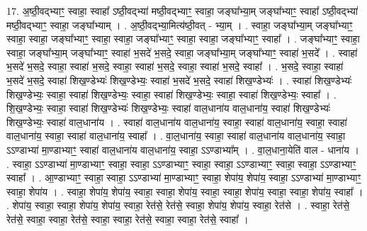 \documentclass[17pt]{extarticle}
\begin{document}
17. अ॒ष्ठी॒वद्भ्याꣳ॒॒ स्वाहा॒ स्वाहा᳚ ऽष्ठी॒वद्भ्या॑ मष्ठी॒वद्भ्याꣳ॒॒ स्वाहा॒ जङ्घा᳚भ्या॒म् जङ्घा᳚भ्याꣳ॒॒ स्वाहा᳚ ऽष्ठी॒वद्भ्या॑ मष्ठी॒वद्भ्याꣳ॒॒ स्वाहा॒ जङ्घा᳚भ्याम् । . अ॒ष्ठी॒वद्भ्या॒मित्य॑ष्ठी॒वत् - भ्या॒म् । . स्वाहा॒ जङ्घा᳚भ्या॒म् जङ्घा᳚भ्याꣳ॒॒ स्वाहा॒ स्वाहा॒ जङ्घा᳚भ्याꣳ॒॒ स्वाहा॒ स्वाहा॒ जङ्घा᳚भ्याꣳ॒॒ स्वाहा॒ स्वाहा॒ जङ्घा᳚भ्याꣳ॒॒ स्वाहा᳚ । . जङ्घा᳚भ्याꣳ॒॒ स्वाहा॒ स्वाहा॒ जङ्घा᳚भ्या॒म् जङ्घा᳚भ्याꣳ॒॒ स्वाहा॑ भ॒सदे॑ भ॒सदे॒ स्वाहा॒ जङ्घा᳚भ्या॒म् जङ्घा᳚भ्याꣳ॒॒ स्वाहा॑ भ॒सदे᳚ । . स्वाहा॑ भ॒सदे॑ भ॒सदे॒ स्वाहा॒ स्वाहा॑ भ॒सदे॒ स्वाहा॒ स्वाहा॑ भ॒सदे॒ स्वाहा॒ स्वाहा॑ भ॒सदे॒ स्वाहा᳚ । . भ॒सदे॒ स्वाहा॒ स्वाहा॑ भ॒सदे॑ भ॒सदे॒ स्वाहा॑ शिख॒ण्डेभ्यः॑ शिख॒ण्डेभ्यः॒ स्वाहा॑ भ॒सदे॑ भ॒सदे॒ स्वाहा॑ शिख॒ण्डेभ्यः॑ । . स्वाहा॑ शिख॒ण्डेभ्यः॑ शिख॒ण्डेभ्यः॒ स्वाहा॒ स्वाहा॑ शिख॒ण्डेभ्यः॒ स्वाहा॒ स्वाहा॑ शिख॒ण्डेभ्यः॒ स्वाहा॒ स्वाहा॑ शिख॒ण्डेभ्यः॒ स्वाहा᳚ । . शि॒ख॒ण्डेभ्यः॒ स्वाहा॒ स्वाहा॑ शिख॒ण्डेभ्यः॑ शिख॒ण्डेभ्यः॒ स्वाहा॑ वाल॒धाना॑य वाल॒धाना॑य॒ स्वाहा॑ शिख॒ण्डेभ्यः॑ शिख॒ण्डेभ्यः॒ स्वाहा॑ वाल॒धाना॑य । . स्वाहा॑ वाल॒धाना॑य वाल॒धाना॑य॒ स्वाहा॒ स्वाहा॑ वाल॒धाना॑य॒ स्वाहा॒ स्वाहा॑ वाल॒धाना॑य॒ स्वाहा॒ स्वाहा॑ वाल॒धाना॑य॒ स्वाहा᳚ । . वा॒ल॒धाना॑य॒ स्वाहा॒ स्वाहा॑ वाल॒धाना॑य वाल॒धाना॑य॒ स्वाहा॒ ऽऽण्डाभ्या॑ मा॒ण्डाभ्याꣳ॒॒ स्वाहा॑ वाल॒धाना॑य वाल॒धाना॑य॒ स्वाहा॒ ऽऽण्डाभ्या᳚म् । . वा॒ल॒धाना॒येति॑ वाल - धाना॑य । . स्वाहा॒ ऽऽण्डाभ्या॑ मा॒ण्डाभ्याꣳ॒॒ स्वाहा॒ स्वाहा॒ ऽऽण्डाभ्याꣳ॒॒ स्वाहा॒ स्वाहा॒ ऽऽण्डाभ्याꣳ॒॒ स्वाहा॒ स्वाहा॒ ऽऽण्डाभ्याꣳ॒॒ स्वाहा᳚ । . आ॒ण्डाभ्याꣳ॒॒ स्वाहा॒ स्वाहा॒ ऽऽण्डाभ्या॑ मा॒ण्डाभ्याꣳ॒॒ स्वाहा॒ शेपा॑य॒ शेपा॑य॒ स्वाहा॒ ऽऽण्डाभ्या॑ मा॒ण्डाभ्याꣳ॒॒ स्वाहा॒ शेपा॑य । . स्वाहा॒ शेपा॑य॒ शेपा॑य॒ स्वाहा॒ स्वाहा॒ शेपा॑य॒ स्वाहा॒ स्वाहा॒ शेपा॑य॒ स्वाहा॒ स्वाहा॒ शेपा॑य॒ स्वाहा᳚ । . शेपा॑य॒ स्वाहा॒ स्वाहा॒ शेपा॑य॒ शेपा॑य॒ स्वाहा॒ रेत॑से॒ रेत॑से॒ स्वाहा॒ शेपा॑य॒ शेपा॑य॒ स्वाहा॒ रेत॑से । . स्वाहा॒ रेत॑से॒ रेत॑से॒ स्वाहा॒ स्वाहा॒ रेत॑से॒ स्वाहा॒ स्वाहा॒ रेत॑से॒ स्वाहा॒ स्वाहा॒ रेत॑से॒ स्वाहा᳚ । \newline
\end{document}
